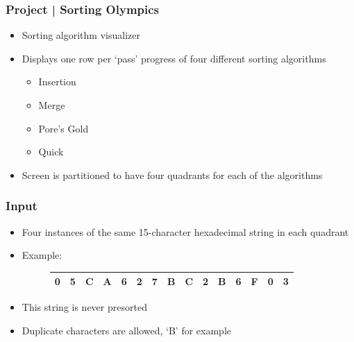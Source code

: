 \documentclass{beamer}
\begin{document}
\begin{frame}
\frametitle{Project | Sorting Olympics} 

\begin{itemize}
		\item Sorting algorithm visualizer
		\item Displays one row per `pass' progress of four different sorting algorithms
				\begin{itemize}
						\item Insertion
						\item Merge
						\item Pore's Gold
						\item Quick
				\end{itemize}
		\item Screen is partitioned to have four quadrants for each of the algorithms
\end{itemize}


\end{frame}

\begin{frame}
\frametitle{Input}
\begin{itemize}
		\item Four instances of the same 15-character hexadecimal string in each quadrant
		\item Example:
		
		\begin{figure}[!htpb]
		\centering
		\begin{table}[]
		\begin{tabular}{|l|l|l|l|l|l|l|l|l|l|l|l|l|l|l|}
		\hline
		0 & 5 & C & A & 6 & 2 & 7 & B & C & 2 & B & 6 & F & 0 & 3 \\ \hline
		\end{tabular}
		\end{table}
		\end{figure}
		\item This string is never presorted
		\item Duplicate characters are allowed, `B' for example

\end{itemize}
\end{frame}
\end{document}
